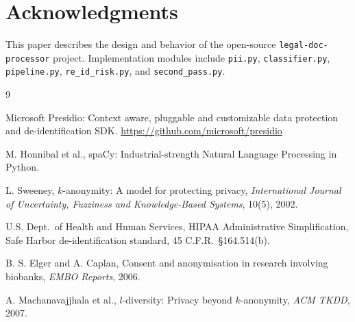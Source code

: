 \documentclass[11pt,a4paper]{article}
\begin{document}
\section*{Acknowledgments}

This paper describes the design and behavior of the open-source \texttt{legal-doc-processor} project. Implementation modules include \texttt{pii.py}, \texttt{classifier.py}, \texttt{pipeline.py}, \texttt{re\_id\_risk.py}, and \texttt{second\_pass.py}.

\begin{thebibliography}{9}

Microsoft Presidio: Context aware, pluggable and customizable data protection and de-identification SDK.
\url{https://github.com/microsoft/presidio}

M. Honnibal et al.,
spaCy: Industrial-strength Natural Language Processing in Python.

L. Sweeney,
$k$-anonymity: A model for protecting privacy,
\emph{International Journal of Uncertainty, Fuzziness and Knowledge-Based Systems},
10(5), 2002.

U.S. Dept.\ of Health and Human Services,
HIPAA Administrative Simplification, Safe Harbor de-identification standard, 45 C.F.R.\ \S 164.514(b).

B. S. Elger and A. Caplan,
Consent and anonymisation in research involving biobanks,
\emph{EMBO Reports}, 2006.

A. Machanavajjhala et al.,
$l$-diversity: Privacy beyond $k$-anonymity,
\emph{ACM TKDD}, 2007.

\end{thebibliography}
\end{document}
